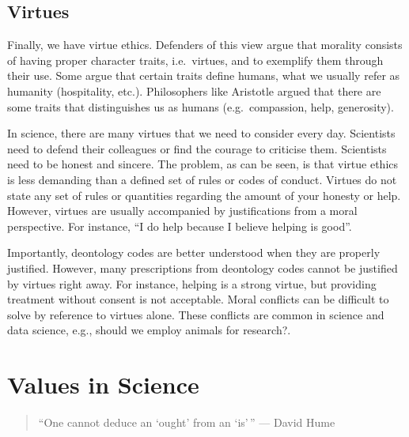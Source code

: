 \documentclass[
]{book}
\begin{document}
\hypertarget{virtues}{%
\subsection{Virtues}\label{virtues}}

Finally, we have virtue ethics. Defenders of this view argue that morality consists of having proper character traits, i.e.~virtues, and to exemplify them through their use. Some argue that certain traits define humans, what we usually refer as humanity (hospitality, etc.). Philosophers like Aristotle argued that there are some traits that distinguishes us as humans (e.g.~compassion, help, generosity).

In science, there are many virtues that we need to consider every day. Scientists need to defend their colleagues or find the courage to criticise them. Scientists need to be honest and sincere. The problem, as can be seen, is that virtue ethics is less demanding than a defined set of rules or codes of conduct. Virtues do not state any set of rules or quantities regarding the amount of your honesty or help. However, virtues are usually accompanied by justifications from a moral perspective. For instance, ``I do help because I believe helping is good''.

Importantly, deontology codes are better understood when they are properly justified. However, many prescriptions from deontology codes cannot be justified by virtues right away. For instance, helping is a strong virtue, but providing treatment without consent is not acceptable. Moral conflicts can be difficult to solve by reference to virtues alone. These conflicts are common in science and data science, e.g., should we employ animals for research?.

\hypertarget{values-in-science}{%
\section{Values in Science}\label{values-in-science}}

\begin{quote}
``One cannot deduce an `ought' from an `is'\,'' --- David Hume
\end{quote}
\end{document}
